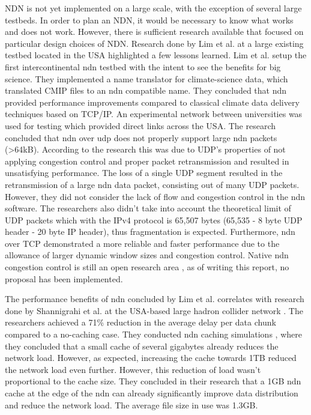 NDN is not yet implemented on a large scale, with the exception of several large testbeds. In order to plan an NDN, it would be necessary to know what works and does not work. However, there is sufficient research available that focused on particular design choices of NDN. Research done by Lim et al. \cite{lim2018ndn} at a large existing testbed located in the USA \cite{ndn-testbed-status} highlighted a few lessons learned. Lim et al. setup the first intercontinental \gls{ndn} testbed with the intent to see the benefits for big science. They implemented a name translator for climate-science data, which translated CMIP files to an \gls{ndn} compatible name. They concluded that \gls{ndn} provided performance improvements compared to classical climate data delivery techniques based on TCP/IP. An experimental network between universities was used for testing which provided direct links across the USA. The research concluded that \gls{ndn} over \gls{udp} does not properly support large \gls{ndn} packets (\textgreater 64kB). According to the research this was due to UDP's properties of not applying congestion control and proper packet retransmission and resulted in unsatisfying performance. The loss of a single UDP segment resulted in the retransmission of a large \gls{ndn} data packet, consisting out of many UDP packets. However, they did not consider the lack of flow and congestion control in the \gls{ndn} software. The researchers also didn't take into account the theoretical limit of UDP packets which with the IPv4 protocol is 65,507 bytes (65,535 - 8 byte UDP header - 20 byte IP header), thus fragmentation is expected. Furthermore, \gls{ndn} over TCP demonstrated a more reliable and faster performance due to the allowance of larger dynamic window sizes and congestion control. Native \gls{ndn} congestion control is still an open research area \cite{ren2016congestion}, as of writing this report, no proposal has been implemented.

The performance benefits of \gls{ndn} concluded by Lim et al. correlates with research done by Shannigrahi et al. at the USA-based large hadron collider network \cite{shannigrahi2015named}. The researchers achieved a 71\% reduction in the average delay per data chunk compared to a no-caching case. They conducted \gls{ndn} caching simulations \cite{shannigrahi2017request}, where they concluded that a small cache of several gigabytes already reduces the network load. However, as expected, increasing the cache towards 1TB reduced the network load even further. However, this reduction of load wasn't proportional to the cache size. They concluded in their research that a 1GB \gls{ndn} cache at the edge of the \gls{ndn} can already significantly improve data distribution and reduce the network load. The average file size in use was 1.3GB.

